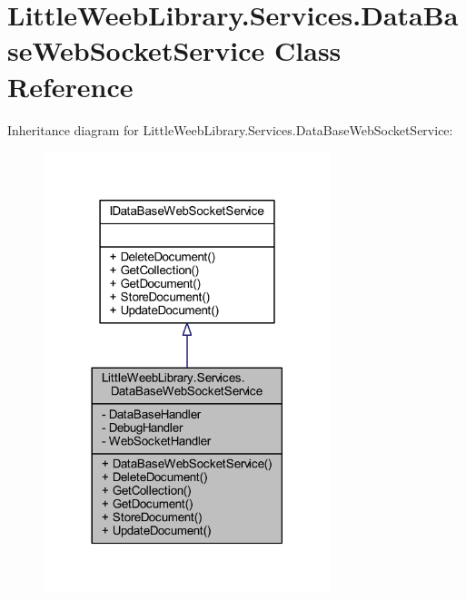 \hypertarget{class_little_weeb_library_1_1_services_1_1_data_base_web_socket_service}{}\section{Little\+Weeb\+Library.\+Services.\+Data\+Base\+Web\+Socket\+Service Class Reference}
\label{class_little_weeb_library_1_1_services_1_1_data_base_web_socket_service}


Inheritance diagram for Little\+Weeb\+Library.\+Services.\+Data\+Base\+Web\+Socket\+Service\+:\nopagebreak
\begin{figure}[H]
\begin{center}
\leavevmode
\includegraphics[width=237pt]{class_little_weeb_library_1_1_services_1_1_data_base_web_socket_service__inherit__graph}
\end{center}
\end{figure}


